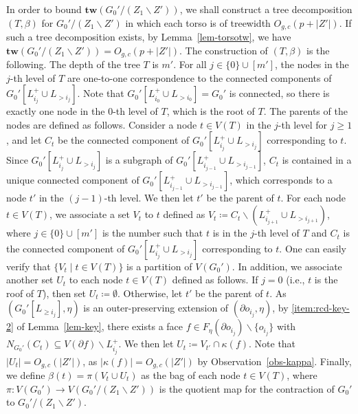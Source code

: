 \documentclass[a4paper,11pt]{article}
\numberwithin{lemma}{section}
\newcommand{\tw}{\mathbf{tw}}
\begin{document}
In order to bound $\tw(G_0'/(Z_1 \backslash Z'))$, we shall construct a tree decomposition $(T,\beta)$ for $G_0'/(Z_1 \backslash Z')$ in which each torso is of treewidth $O_{g,c}(p+|Z'|)$.
If such a tree decomposition exists, by Lemma~\ref{lem-torsotw}, we have $\tw(G_0'/(Z_1 \backslash Z')) = O_{g,c}(p+|Z'|)$.
The construction of $(T,\beta)$ is the following.
The depth of the tree $T$ is $m'$.
For all $j \in \{0\} \cup [m']$, the nodes in the $j$-th level of $T$ are one-to-one correspondence to the connected components of $G_0'[L_{i_j}^+ \cup L_{> i_j}]$.
Note that $G_0'[L_{i_0}^+ \cup L_{> i_0}] = G_0'$ is connected, so there is exactly one node in the $0$-th level of $T$, which is the root of $T$.
The parents of the nodes are defined as follows.
Consider a node $t \in V(T)$ in the $j$-th level for $j \geq 1$, and let $C_t$ be the connected component of $G_0'[L_{i_j}^+ \cup L_{> i_j}]$ corresponding to $t$.
Since $G_0'[L_{i_j}^+ \cup L_{> i_j}]$ is a subgraph of $G_0'[L_{i_{j-1}}^+ \cup L_{> i_{j-1}}]$, $C_t$ is contained in a unique connected component of $G_0'[L_{i_{j-1}}^+ \cup L_{> i_{j-1}}]$, which corresponds to a node $t'$ in the $(j-1)$-th level.
We then let $t'$ be the parent of $t$.
For each node $t \in V(T)$, we associate a set $V_t$ to $t$ defined as $V_t \coloneqq C_t \backslash (L_{i_{j+1}}^+ \cup L_{> i_{j+1}})$, where $j \in \{0\} \cup [m']$ is the number such that $t$ is in the $j$-th level of $T$ and $C_t$ is the connected component of $G_0'[L_{i_j}^+ \cup L_{> i_j}]$ corresponding to $t$.
One can easily verify that $\{V_t \mid t \in V(T)\}$ is a partition of $V(G_0')$.
In addition, we associate another set $U_t$ to each node $t \in V(T)$ defined as follows.
If $j = 0$ (i.e., $t$ is the roof of $T$), then set $U_t \coloneqq \emptyset$.
Otherwise, let $t'$ be the parent of $t$.
As $(G_0'[L_{\geq i_j}],\eta)$ is an outer-preserving extension of $(\partial o_{i_j},\eta)$, by \ref{item:rcd-key-2} of Lemma~\ref{lem-key}, there exists a face $f \in F_\eta(\partial o_{i_j}) \backslash \{o_{i_j}\}$ with $N_{G_0'}(C_t) \subseteq V(\partial f) \backslash L_{i_j}^+$.
We then let $U_t \coloneqq V_{t'} \cap \kappa(f)$.
Note that $|U_t| = O_{g,c}(|Z'|)$, as $|\kappa(f)| = O_{g,c}(|Z'|)$ by Observation~\ref{obs-kappa}.
Finally, we define $\beta(t) = \pi(V_t \cup U_t)$ as the bag of each node $t \in V(T)$, where $\pi: V(G_0') \rightarrow V(G_0'/(Z_1 \backslash Z'))$ is the quotient map for the contraction of $G_0'$ to $G_0'/(Z_1 \backslash Z')$.
\end{document}
